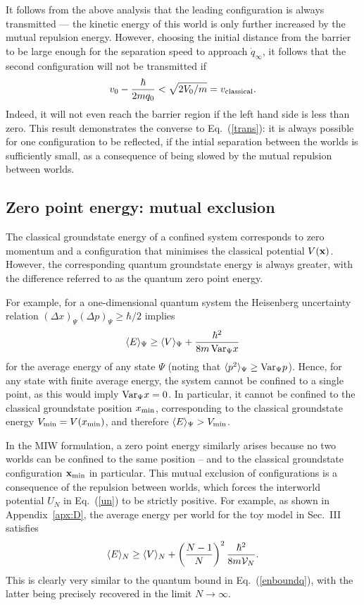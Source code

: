 \documentclass[twocolumn,aps,pra,amsmath,amssymb,superscriptaddress]{revtex4}
\renewcommand{\(}{\left(}
\renewcommand{\)}{\right)}
\newcommand{\blk}{\color{black}}
\begin{document}
It follows from the above analysis that the leading configuration is always transmitted --- the kinetic energy of this world is only further increased by the mutual repulsion energy.  However, choosing the initial distance from the barrier to be large enough for the separation speed to approach $\dot q_\infty$, it follows that the second configuration will not be transmitted  if
\begin{equation} \label{ref} 
v_0 - \frac{\hbar}{2mq_0} < \sqrt{2V_0/m} = v_{\rm classical}.
\end{equation}
Indeed, it will not even reach the barrier region if the left hand side is less than zero. This result demonstrates the converse to Eq.~(\ref{trans}): it is always possible for one configuration to be reflected, if the intial separation between the worlds is sufficiently small, as a consequence of being slowed by the mutual repulsion between worlds.


\subsection{Zero point energy: mutual exclusion}

The classical groundstate energy of a confined system corresponds to zero momentum and a configuration that minimises the classical potential $V({\bf x})$.  However, the corresponding quantum groundstate energy is always greater, with the difference referred to as the quantum zero point energy.  

For example, for a one-dimensional quantum system  the Heisenberg uncertainty relation $(\Delta x)_\Psi (\Delta p)_\Psi \geq \hbar/2$ implies 
\begin{equation} \label{enboundq}
\langle E\rangle_\Psi \geq \langle V\rangle_\Psi + \frac{\hbar^2}{8m \,{\rm Var}_\Psi x} 
\end{equation}
for the average energy of any state $\Psi$ (noting that $\langle
p^2\rangle_\Psi\geq {\rm Var}_\Psi p$).  Hence, for any state with finite
average energy, the system cannot be confined to a single point, as this would
imply ${\rm Var}_\Psi x =0$. In particular, it cannot be confined to the
classical groundstate position $x_{\rm min}$, corresponding to the classical
groundstate energy  $V_{\rm min}=V(x_{\rm min})$, and therefore $\langle
E\rangle_\Psi >V_{\rm min}$. \blk

In the MIW formulation, a zero point energy similarly arises because no two worlds can be confined to the same position -- and to the classical groundstate configuration ${\bf x}_{\rm min}$ in particular. This mutual exclusion of configurations is a consequence of the repulsion between worlds, which forces the interworld potential $U_N$ in Eq.~(\ref{un}) to be strictly positive.  For example, as shown in  Appendix~\ref{apx:D}, \blk the average energy per world for the  toy model in Sec.~III satisfies 
\begin{equation} \label{enboundn}
\langle E\rangle_N \geq \langle V\rangle_N + \left(\frac{N-1}{N}\right)^2\frac{\hbar^2}{8m  {\cal V}_N} .
\end{equation} 
This is clearly very similar to the quantum bound in Eq.~(\ref{enboundq}), with the latter being precisely recovered in the limit  $N\rightarrow\infty$. 
\end{document}
